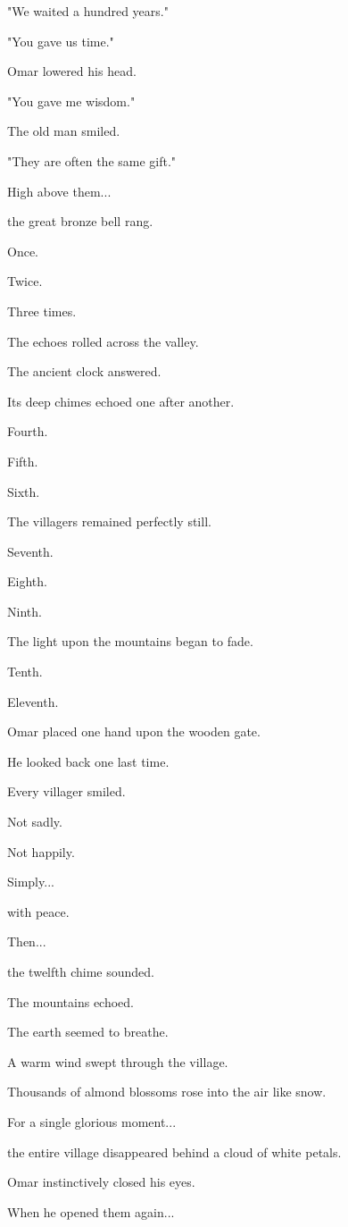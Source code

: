 \documentclass[12pt,openany]{book}
\begin{document}
"We waited a hundred years."

"You gave us time."

Omar lowered his head.

"You gave me wisdom."

The old man smiled.

"They are often the same gift."

High above them...

the great bronze bell rang.

Once.

Twice.

Three times.

The echoes rolled across the valley.

The ancient clock answered.

Its deep chimes echoed one after another.

Fourth.

Fifth.

Sixth.

The villagers remained perfectly still.

Seventh.

Eighth.

Ninth.

The light upon the mountains began to fade.

Tenth.

Eleventh.

Omar placed one hand upon the wooden gate.

He looked back one last time.

Every villager smiled.

Not sadly.

Not happily.

Simply...

with peace.

Then...

the twelfth chime sounded.

The mountains echoed.

The earth seemed to breathe.

A warm wind swept through the village.

Thousands of almond blossoms rose into the air like snow.

For a single glorious moment...

the entire village disappeared behind a cloud of white petals.

Omar instinctively closed his eyes.

When he opened them again...
\end{document}
